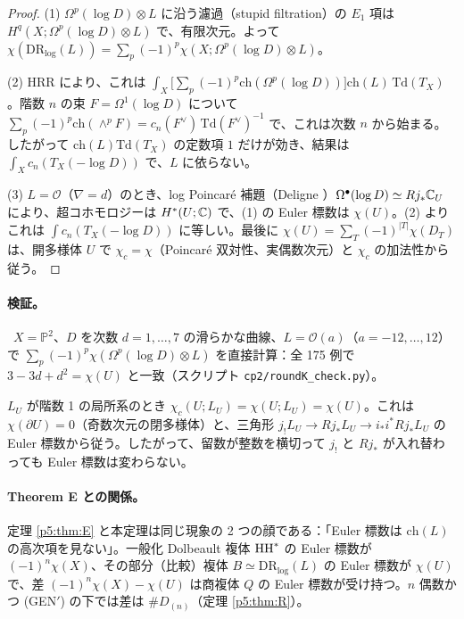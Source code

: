 \begin{proof}
(1) $\Omega^p(\log D)\otimes L$ に沿う濾過（stupid filtration）の $E_1$ 項は $H^q(X;\Omega^p(\log D)\otimes L)$ で、有限次元。よって $\chi(\mathrm{DR}_{\log}(L))=\sum_p(-1)^p\chi(X;\Omega^p(\log D)\otimes L)$。

(2) HRR により、これは $\int_X\bigl[\sum_p(-1)^p\mathrm{ch}(\Omega^p(\log D))\bigr]\mathrm{ch}(L)\,\mathrm{Td}(T_X)$。階数 $n$ の束 $F=\Omega^1(\log D)$ について $\sum_p(-1)^p\mathrm{ch}(\wedge^pF)=c_n(F^\vee)\,\mathrm{Td}(F^\vee)^{-1}$ で、これは次数 $n$ から始まる。したがって $\mathrm{ch}(L)\mathrm{Td}(T_X)$ の定数項 $1$ だけが効き、結果は $\int_Xc_n(T_X(-\log D))$ で、$L$ に依らない。

(3) $L=\mathcal O$（$\nabla=d$）のとき、log Poincar\'e 補題（Deligne \cite{Del}）$\Omega^\bullet(\log D)\simeq Rj_*\mathbb C_U$ により、超コホモロジーは $H^*(U;\mathbb C)$ で、(1) の Euler 標数は $\chi(U)$。(2) よりこれは $\int c_n(T_X(-\log D))$ に等しい。最後に $\chi(U)=\sum_T(-1)^{|T|}\chi(D_T)$ は、開多様体 $U$ で $\chi_c=\chi$（Poincar\'e 双対性、実偶数次元）と $\chi_c$ の加法性から従う。
\end{proof}
\paragraph{検証。}\tV\ $X=\mathbb P^2$、$D$ を次数 $d=1,\dots,7$ の滑らかな曲線、$L=\mathcal O(a)$（$a=-12,\dots,12$）で $\sum_p(-1)^p\chi(\Omega^p(\log D)\otimes L)$ を直接計算：全 175 例で $3-3d+d^2=\chi(U)$ と一致（スクリプト \texttt{cp2/roundK\_check.py}）。

\begin{cor}[壁越えの恒等式\ \tP]\label{p5:cor:wall}
$L_U$ が階数 1 の局所系のとき $\chi_c(U;L_U)=\chi(U;L_U)=\chi(U)$。これは $\chi(\partial U)=0$（奇数次元の閉多様体）と、三角形 $j_!L_U\to Rj_*L_U\to i_*i^*Rj_*L_U$ の Euler 標数から従う。したがって、留数が整数を横切って $j_!$ と $Rj_*$ が入れ替わっても Euler 標数は変わらない。
\end{cor}
\paragraph{Theorem E との関係。}定理 \ref{p5:thm:E} と本定理は同じ現象の 2 つの顔である：「Euler 標数は $\mathrm{ch}(L)$ の高次項を見ない」。一般化 Dolbeault 複体 $\mathrm{HH}^*$ の Euler 標数が $(-1)^n\chi(X)$、その部分（比較）複体 $B\simeq\mathrm{DR}_{\log}(L)$ の Euler 標数が $\chi(U)$ で、差 $(-1)^n\chi(X)-\chi(U)$ は商複体 $Q$ の Euler 標数が受け持つ。$n$ 偶数かつ (GEN$'$) の下では差は $\#D_{(n)}$（定理 \ref{p5:thm:R}）。

